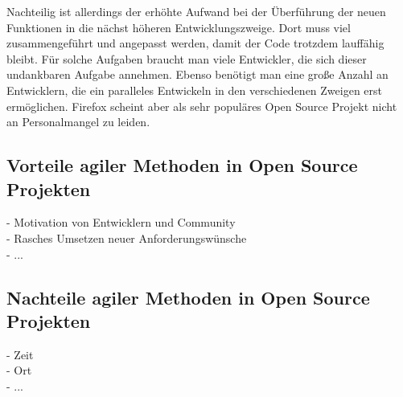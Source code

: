 Nachteilig ist allerdings der erhöhte Aufwand bei der Überführung der neuen Funktionen in die nächst höheren Entwicklungszweige. Dort muss viel zusammengeführt und angepasst werden, damit der Code trotzdem lauffähig bleibt. Für solche Aufgaben braucht man viele Entwickler, die sich dieser undankbaren Aufgabe annehmen. Ebenso benötigt man eine große Anzahl an Entwicklern, die ein paralleles Entwickeln in den verschiedenen Zweigen erst ermöglichen. Firefox scheint aber als sehr populäres Open Source Projekt nicht an Personalmangel zu leiden.
\subsection{Vorteile agiler Methoden in Open Source Projekten}
  - Motivation von Entwicklern und Community\\
  - Rasches Umsetzen neuer Anforderungswünsche\\
  - ...
  
\subsection{Nachteile agiler Methoden in Open Source Projekten}
  - Zeit\\
  - Ort\\
  - ...


